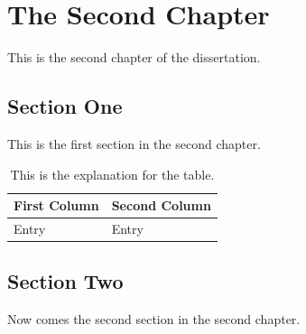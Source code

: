 \chapter{The Second Chapter}

This is the second chapter of the dissertation.


\section{Section One}

This is the first section in the second chapter.



\begin{table}[htb]
\centering
\begin{tabular}{l|l}
First Column & Second Column \\ \hline
Entry & Entry
\end{tabular}
 \caption[Short form for the list of tables]{This is the explanation for the table.}
\end{table}


\section{Section Two}

Now comes the second section in the second chapter.
